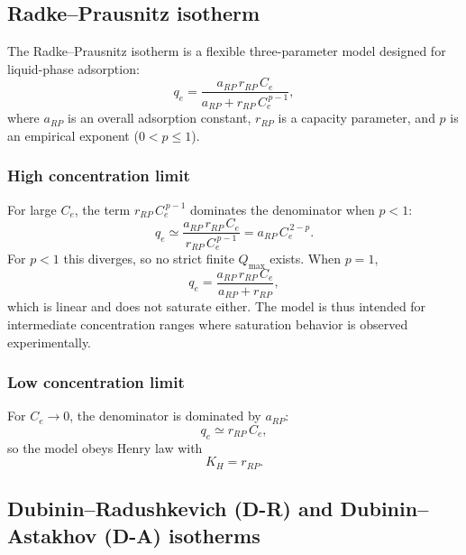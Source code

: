 \documentclass[12pt]{article}
\begin{document}
	\subsection{Radke--Prausnitz isotherm}

	The Radke--Prausnitz isotherm is a flexible three-parameter model
	designed for liquid-phase adsorption:
	\begin{equation}
		q_e = \frac{a_{RP}\, r_{RP}\, C_e}{a_{RP} + r_{RP}\, C_e^{\,p-1}},
		\label{eq:RadkePrausnitz}
	\end{equation}
	where $a_{RP}$ is an overall adsorption constant, $r_{RP}$ is a
	capacity parameter, and $p$ is an empirical exponent
	($0 < p \leq 1$).

	\subsubsection{High concentration limit}

	For large $C_e$, the term $r_{RP}\,C_e^{\,p-1}$ dominates the
	denominator when $p < 1$:
	\begin{equation}
		q_e \simeq \frac{a_{RP}\, r_{RP}\, C_e}{r_{RP}\, C_e^{\,p-1}}
		= a_{RP}\, C_e^{\,2-p}.
	\end{equation}
	For $p < 1$ this diverges, so no strict finite $Q_{\max}$ exists.
	When $p = 1$,
	\begin{equation}
		q_e = \frac{a_{RP}\, r_{RP}\, C_e}{a_{RP} + r_{RP}},
	\end{equation}
	which is linear and does not saturate either. The model is thus
	intended for intermediate concentration ranges where saturation
	behavior is observed experimentally.

	\subsubsection{Low concentration limit}

	For $C_e \to 0$, the denominator is dominated by $a_{RP}$:
	\begin{equation}
		q_e \simeq r_{RP}\, C_e,
	\end{equation}
	so the model obeys Henry law with
	\begin{equation}
		\boxed{K_H = r_{RP}.}
	\end{equation}

	\subsection{Dubinin--Radushkevich (D-R) and Dubinin--Astakhov (D-A) isotherms}
\end{document}
